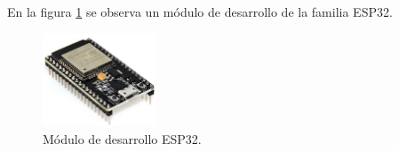 En la figura \ref{fig:esp32} se observa un módulo de desarrollo de la familia ESP32.



\begin{figure}[h]
	\centering
	\includegraphics[width=0.30\textwidth]{./Figures/esp32.jpg}
	\caption[Módulo de desarrollo ESP32.]{Módulo de desarrollo ESP32.}
	\label{fig:esp32}

\end{figure}

